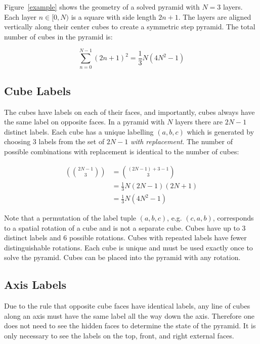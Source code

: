 \documentclass[conference]{IEEEtran}
\begin{document}
Figure~\ref{example} shows the geometry of a solved pyramid with $N=3$ layers.
Each layer $n\in[0,N)$ is a square with side length $2n+1$.
The layers are aligned vertically along their center cubes to create a symmetric step pyramid. The total number of cubes in the pyramid is:

\begin{equation}
\sum_{n=0}^{N-1}(2n+1)^2 = \frac{1}{3}N(4N^2-1)
\end{equation}

\subsection{Cube Labels}

The cubes have labels on each of their faces, and importantly, cubes always have the same label on opposite faces.
In a pyramid with $N$ layers there are $2N-1$ distinct labels.
Each cube has a unique labelling $(a,b,c)$ which is generated by choosing 3 labels from the set of $2N-1$ \emph{with replacement}.
The number of possible combinations with replacement is identical to the number of cubes:

\begin{equation}
\begin{aligned}
\left(\binom{2N-1}{3}\right) &= \binom{(2N-1)+3-1}{3} \\
&= \frac{1}{3}N(2N-1)(2N+1) \\
&= \frac{1}{3}N(4N^2-1)
\end{aligned}
\end{equation}

Note that a permutation of the label tuple $(a,b,c)$, e.g. $(c,a,b)$, corresponds to a spatial rotation of a cube and is not a separate cube.
Cubes have up to 3 distinct labels and 6 possible rotations.
Cubes with repeated labels have fewer distinguishable rotations.
Each cube is unique and must be used exactly once to solve the pyramid.
Cubes can be placed into the pyramid with any rotation.

\subsection{Axis Labels}

Due to the rule that opposite cube faces have identical labels, any line of cubes along an axis must have the same label all the way down the axis.
Therefore one does not need to see the hidden faces to determine the state of the pyramid.
It is only necessary to see the labels on the top, front, and right external faces.
\end{document}
